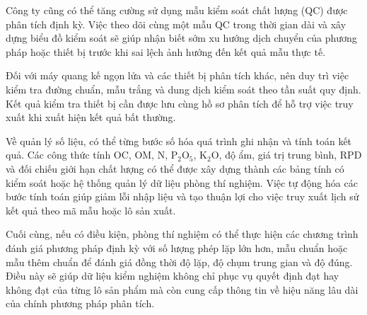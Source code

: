 Công ty cũng có thể tăng cường sử dụng mẫu kiểm soát chất lượng (QC) được phân tích định kỳ. Việc theo dõi cùng một mẫu QC trong thời gian dài và xây dựng biểu đồ kiểm soát sẽ giúp nhận biết sớm xu hướng dịch chuyển của phương pháp hoặc thiết bị trước khi sai lệch ảnh hưởng đến kết quả mẫu thực tế.

Đối với máy quang kế ngọn lửa và các thiết bị phân tích khác, nên duy trì việc kiểm tra đường chuẩn, mẫu trắng và dung dịch kiểm soát theo tần suất quy định. Kết quả kiểm tra thiết bị cần được lưu cùng hồ sơ phân tích để hỗ trợ việc truy xuất khi xuất hiện kết quả bất thường.

Về quản lý số liệu, có thể từng bước số hóa quá trình ghi nhận và tính toán kết quả. Các công thức tính OC, OM, N, P$_2$O$_5$, K$_2$O, độ ẩm, giá trị trung bình, RPD và đối chiếu giới hạn chất lượng có thể được xây dựng thành các bảng tính có kiểm soát hoặc hệ thống quản lý dữ liệu phòng thí nghiệm. Việc tự động hóa các bước tính toán giúp giảm lỗi nhập liệu và tạo thuận lợi cho việc truy xuất lịch sử kết quả theo mã mẫu hoặc lô sản xuất.

Cuối cùng, nếu có điều kiện, phòng thí nghiệm có thể thực hiện các chương trình đánh giá phương pháp định kỳ với số lượng phép lặp lớn hơn, mẫu chuẩn hoặc mẫu thêm chuẩn để đánh giá đồng thời độ lặp, độ chụm trung gian và độ đúng. Điều này sẽ giúp dữ liệu kiểm nghiệm không chỉ phục vụ quyết định đạt hay không đạt của từng lô sản phẩm mà còn cung cấp thông tin về hiệu năng lâu dài của chính phương pháp phân tích.
